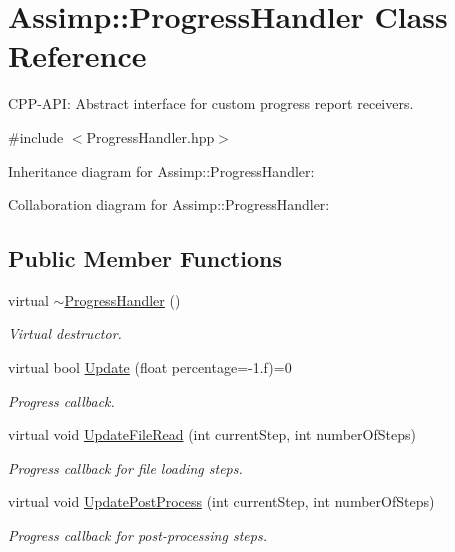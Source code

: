 \hypertarget{class_assimp_1_1_progress_handler}{\section{Assimp\-:\-:Progress\-Handler Class Reference}
\label{class_assimp_1_1_progress_handler}
}


C\-P\-P-\/\-A\-P\-I\-: Abstract interface for custom progress report receivers.  




{\ttfamily \#include $<$Progress\-Handler.\-hpp$>$}



Inheritance diagram for Assimp\-:\-:Progress\-Handler\-:


Collaboration diagram for Assimp\-:\-:Progress\-Handler\-:
\subsection*{Public Member Functions}
\begin{DoxyCompactItemize}
\item 
\hypertarget{class_assimp_1_1_progress_handler_a3ec465a62e1feaae00f585ca0cffb81e}{virtual \hyperlink{class_assimp_1_1_progress_handler_a3ec465a62e1feaae00f585ca0cffb81e}{$\sim$\-Progress\-Handler} ()}\label{class_assimp_1_1_progress_handler_a3ec465a62e1feaae00f585ca0cffb81e}

\begin{DoxyCompactList}\small\item\em Virtual destructor. \end{DoxyCompactList}\item 
virtual bool \hyperlink{class_assimp_1_1_progress_handler_ab08a1d300d434f6dd86ca41747cba448}{Update} (float percentage=-\/1.f)=0
\begin{DoxyCompactList}\small\item\em Progress callback. \end{DoxyCompactList}\item 
virtual void \hyperlink{class_assimp_1_1_progress_handler_a0c867692ee9d1e25dec1e2f08fb5e20d}{Update\-File\-Read} (int current\-Step, int number\-Of\-Steps)
\begin{DoxyCompactList}\small\item\em Progress callback for file loading steps. \end{DoxyCompactList}\item 
virtual void \hyperlink{class_assimp_1_1_progress_handler_a57b30d2a9b2ae1f932918f18c30196ed}{Update\-Post\-Process} (int current\-Step, int number\-Of\-Steps)
\begin{DoxyCompactList}\small\item\em Progress callback for post-\/processing steps. \end{DoxyCompactList}\end{DoxyCompactItemize}
